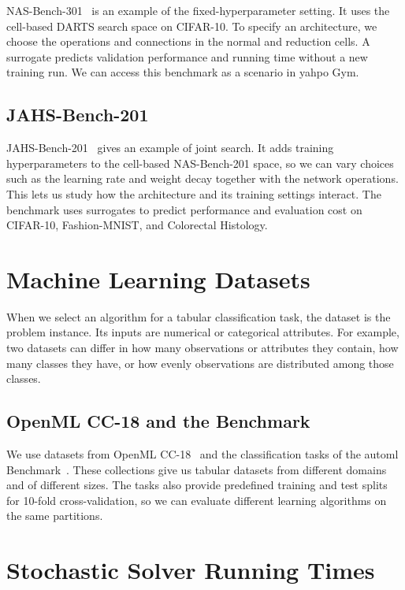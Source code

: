 NAS-Bench-301~\citep{ZelEtAl22} is an example of the fixed-hyperparameter setting. It uses the cell-based DARTS search space on CIFAR-10. To specify an architecture, we choose the operations and connections in the normal and reduction cells. A surrogate predicts validation performance and running time without a new training run. We can access this benchmark as a scenario in \gls{yahpo} Gym.

\subsection{JAHS-Bench-201}
\label{sec:ch03:jahs_bench201}

JAHS-Bench-201~\citep{BanEtAl22} gives an example of joint search. It adds training hyperparameters to the cell-based NAS-Bench-201 space, so we can vary choices such as the learning rate and weight decay together with the network operations. This lets us study how the architecture and its training settings interact. The benchmark uses surrogates to predict performance and evaluation cost on CIFAR-10, Fashion-MNIST, and Colorectal Histology.

\section{Machine Learning Datasets}
\label{sec:ch03:tabular_data}

When we select an algorithm for a tabular classification task, the dataset is the problem instance. Its inputs are numerical or categorical attributes. For example, two datasets can differ in how many observations or attributes they contain, how many classes they have, or how evenly observations are distributed among those classes.

\subsection{OpenML CC-18 and the  Benchmark}

We use datasets from OpenML CC-18~\citep{BisEtAl21} and the classification tasks of the \gls{automl} Benchmark~\citep{GijEtAl24}. These collections give us tabular datasets from different domains and of different sizes. The tasks also provide predefined training and test splits for 10-fold cross-validation, so we can evaluate different learning algorithms on the same partitions.

\section{Stochastic Solver Running Times}
\label{sec:ch03:stochastic_solvers}

